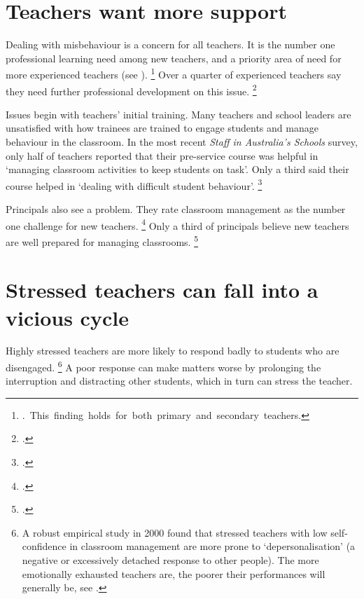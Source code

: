 \documentclass[FrontPage]{grattan}
\begin{document}
\citetrackertrue

\section{Teachers want more support}\label{sec:teachers-want-support}

Dealing with misbehaviour is a concern for all teachers. It is the number one professional learning need among new teachers, and a priority area of need for more experienced teachers (see ).%
    \footnote{\mbox{\textcite{McKenzie2014StaffAustraliasSchools}. This finding holds for both primary and secondary teachers}.}  %
Over a quarter of experienced teachers say they need further professional development on this issue.%
    \footcite{McKenzie2014StaffAustraliasSchools}

Issues begin with teachers' initial training. Many teachers and school leaders are unsatisfied with how trainees are trained to engage students and manage behaviour in the classroom. In the most recent \emph{Staff in Australia's Schools} survey, only half of teachers reported that their pre-service course was helpful in `managing classroom activities to keep students on task'. Only a third said their course helped in `dealing with difficult student behaviour'.%
    \footcite{McKenzie2014StaffAustraliasSchools} 
 
Principals also see a problem. They rate classroom management as the number one challenge for new teachers.%
    \footcite{Mayer2014LongitudinalTeacherEducation} 
Only a third of principals believe new teachers are well prepared for managing classrooms.%
    \footcite{AITSL2015InitialTeacherEducation}


\section{Stressed teachers can fall into a vicious cycle}\label{sec:stressed-teachers-vicious-cycle}
Highly stressed teachers are more likely to respond badly to students who are disengaged.%
    \footnote{A robust empirical study in 2000 found that stressed teachers with low self-confidence in classroom management are more prone to `depersonalisation' (a negative or excessively detached response to other people). The more emotionally exhausted teachers are, the poorer their performances will generally be, see \textcite{BrouwersTomic2000LongitudinalStudyTeacher}.} 
A poor response can make matters worse by prolonging the interruption and distracting other students, which in turn can stress the teacher.
\end{document}
